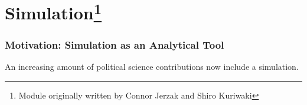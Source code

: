 \documentclass[]{book}
\newenvironment{Shaded}{\begin{snugshade}}{\end{snugshade}}
\let\rmarkdownfootnote\footnote%
\def\footnote{\protect\rmarkdownfootnote}
\theoremstyle{definition}
\theoremstyle{definition}
\theoremstyle{definition}
\theoremstyle{remark}
\begin{document}
\begin{Shaded}
\begin{Highlighting}[]
\begin{Shaded}
\begin{Highlighting}[]
\begin{Shaded}
\begin{Highlighting}[]
\hypertarget{simulation}{%
\chapter[Simulation]{\texorpdfstring{Simulation\footnote{Module originally written by Connor Jerzak and Shiro Kuriwaki}}{Simulation}}\label{simulation}}

\hypertarget{motivation-simulation-as-an-analytical-tool}{%
\subsection*{Motivation: Simulation as an Analytical Tool}\label{motivation-simulation-as-an-analytical-tool}}

An increasing amount of political science contributions now include a simulation.


\end{Highlighting}
\end{Shaded}
\end{Highlighting}
\end{Shaded}
\end{Highlighting}
\end{Shaded}
\end{document}
